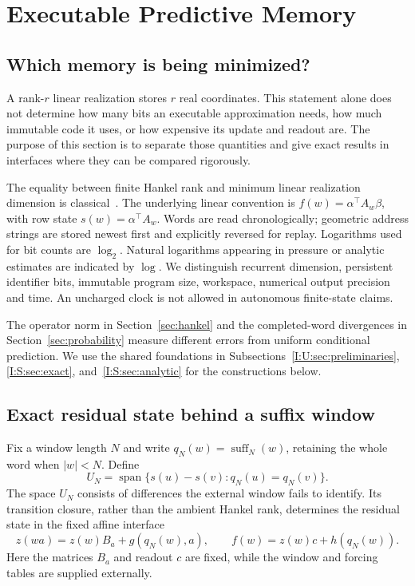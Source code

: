 \chapter{Executable Predictive Memory}\label{sec:memory}

\section{Which memory is being minimized?}
A rank-$r$ linear realization stores $r$ real coordinates. This statement
alone does not determine how many bits an executable approximation needs,
how much immutable code it uses, or how expensive its update and readout
are. The purpose of this section is to separate those quantities and give
exact results in interfaces where they can be compared rigorously.

The equality between finite Hankel rank and minimum linear realization
dimension is classical~\citep{carlyle1971,fliess1974}.
The underlying linear convention is
$f(w)=\alpha^\top A_w\beta$, with row state
$s(w)=\alpha^\top A_w$. Words are read chronologically; geometric
address strings are stored newest first and explicitly reversed for
replay. Logarithms used for bit counts are $\log_2$. Natural logarithms
appearing in pressure or analytic estimates are indicated by $\log$.
We distinguish recurrent dimension, persistent identifier bits,
immutable program size, workspace, numerical output precision and time.
An uncharged clock is not allowed in autonomous finite-state claims.

The operator norm in Section~\ref{sec:hankel} and the completed-word
divergences in Section~\ref{sec:probability} measure different errors
from uniform conditional prediction. We use the shared foundations in
Subsections~\ref{I:U:sec:preliminaries}, \ref{I:S:sec:exact},
and~\ref{I:S:sec:analytic} for the constructions below.

\section{Exact residual state behind a suffix window}
Fix a window length $N$ and write $q_N(w)=\operatorname{suff}_N(w)$,
retaining the whole word when $|w|<N$. Define
\[
 U_N=\operatorname{span}\{s(u)-s(v):q_N(u)=q_N(v)\}.
\]
The space $U_N$ consists of differences the external window fails to
identify. Its transition closure, rather than the ambient Hankel rank,
determines the residual state in the fixed affine interface
\[
 z(wa)=z(w)B_a+g(q_N(w),a),\qquad
 f(w)=z(w)c+h(q_N(w)).
\]
Here the matrices $B_a$ and readout $c$ are fixed, while the window and
forcing tables are supplied externally.

